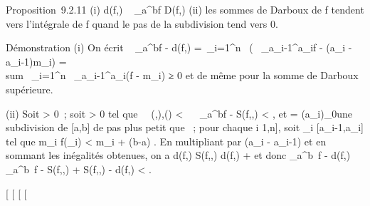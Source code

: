 \documentclass[]{article}
\begin{document}
Proposition~9.2.11 (i) d(f,\sigma) \leq\int ~
\_a^bf \leq D(f,\sigma) (ii) les sommes de Darboux de f tendent
vers l'intégrale de f quand le pas de la subdivision tend vers 0.

Démonstration (i) On écrit \int ~
\_a^bf - d(f,\sigma) =\
\sum  \_i=1^n~\left
(\int ~
\_a\_i-1^a\_if - (a\_i -
a\_i-1)m\_i\right )
= \\sum~
\_i=1^n\int ~
\_a\_i-1^a\_i(f - m\_i) ≥ 0 et de
même pour la somme de Darboux supérieure.

(ii) Soit \epsilon \textgreater{} 0~; soit \eta \textgreater{} 0 tel que
\forall~~(\sigma,\xi),\quad \delta(\sigma) \textless{} \eta
\rigtharrow~\left \textbar{}\int ~
\_a^bf - S(f,\sigma,\xi)\right \textbar{}
\textless{} \epsilon {} , et \sigma =
(a\_i)\_0\leqi\leqn une subdivision de {[}a,b{]} de pas plus
petit que \eta~; pour chaque i \in {[}1,n{]}, soit \xi\_i \in
{[}a\_i-1,a\_i{]} tel que m\_i \leq f(\xi\_i)
\textless{} m\_i + \epsilon {}(b-a) . En
multipliant par (a\_i - a\_i-1) et en sommant les
inégalités obtenues, on a d(f,\sigma) \leq S(f,\sigma,\xi) \leq d(f,\sigma) + \epsilon
\over 2 et donc \left
\textbar{}\int  \_a^b~f -
d(f,\sigma)\right \textbar{}\leq\left
\textbar{}\int  \_a^b~f -
S(f,\sigma,\xi)\right \textbar{} + \textbar{}S(f,\sigma,\xi) -
d(f,\sigma)\textbar{} \textless{} \epsilon.

{[}
{[}
{[}
{[}
\end{document}
